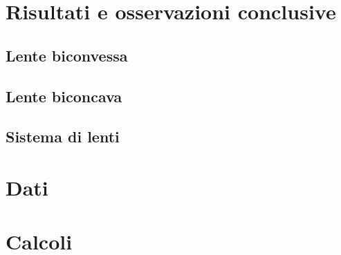 \documentclass[a4paper]{article}
\begin{document}
\section{Risultati e osservazioni conclusive}
    \subsection{Lente biconvessa}
    \subsection{Lente biconcava}
    \subsection{Sistema di lenti}
\begin{appendices}
    \section{Dati}
    \section{Calcoli}
\end{appendices}
\end{document}
